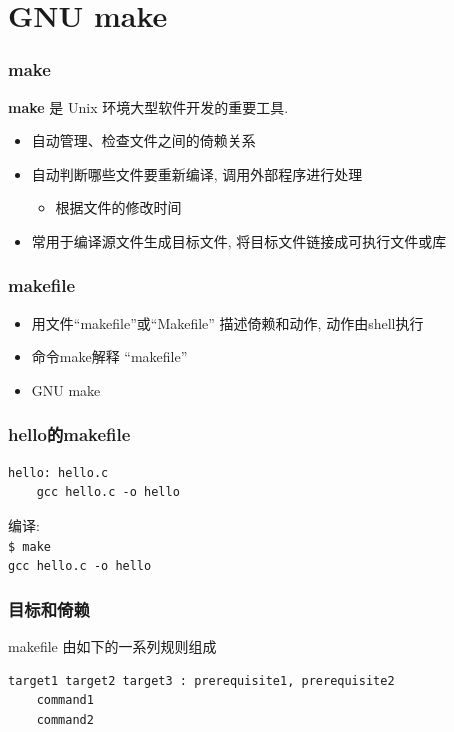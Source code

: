 \documentclass[compress]{beamer}
\begin{document}
\section{GNU make}

\begin{frame}
\frametitle{make}

\textbf{make} 是 Unix 环境大型软件开发的重要工具.
\begin{itemize}
\item 自动管理、检查文件之间的倚赖关系
\item 自动判断哪些文件要重新编译, 调用外部程序进行处理
    \begin{itemize}
    \item 根据文件的修改时间
    \end{itemize}
\item 常用于编译源文件生成目标文件, 将目标文件链接成可执行文件或库
  \end{itemize}

\end{frame}

\begin{frame}
  \frametitle{makefile}
  \begin{itemize}
\item 用文件``makefile''或``Makefile'' 描述倚赖和动作, 动作由shell执行
\item 命令{make}解释 ``makefile''
\item GNU make
\end{itemize}
\end{frame}

\begin{frame}[containsverbatim]
\frametitle{hello的makefile}

\begin{Verbatim}[showtabs=true]
hello: hello.c
	gcc hello.c -o hello
\end{Verbatim}

编译:\\
\verb~$ make~ \\
\verb~gcc hello.c -o hello~


\end{frame}

\begin{frame}[containsverbatim]
\frametitle{目标和倚赖}

makefile 由如下的一系列规则组成\\[1ex]

\begin{Verbatim}[showtabs=true]
target1 target2 target3 : prerequisite1, prerequisite2
	command1
	command2
\end{Verbatim}
\end{frame}
\end{document}
